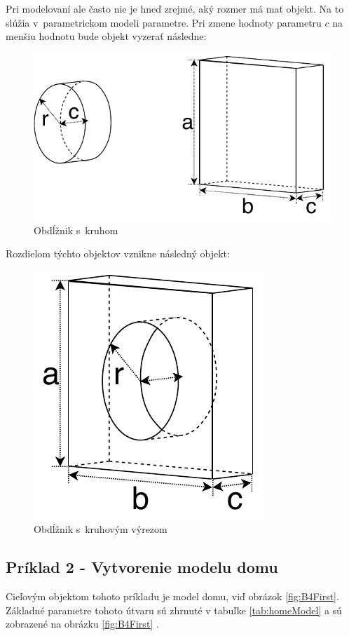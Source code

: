 Pri modelovaní ale často nie je hneď zrejmé, aký rozmer má mať objekt. Na to slúžia v~parametrickom modeli parametre. Pri zmene hodnoty parametru $c$ na menšiu hodnotu bude objekt vyzerať následne:\nopagebreak
\begin{figure}[H]
	\centering
	\includegraphics[height=0.3\textwidth]{obrazky-figures/Examples/A3x.pdf}
	\caption{Obdĺžnik s~kruhom}
	\label{fig:A3x}
\end{figure}
Rozdielom týchto objektov vznikne následný objekt:\nopagebreak
\begin{figure}[H]
	\centering
	\includegraphics[height=0.3\textwidth]{obrazky-figures/Examples/A4x.pdf}
	\caption{Obdĺžnik s~kruhovým výrezom}
	\label{fig:A4x}
\end{figure}

\subsection*{Príklad 2 - Vytvorenie modelu domu}
Cieľovým objektom tohoto príkladu je model domu, viď obrázok \ref{fig:B4First}. Základné parametre tohoto útvaru sú zhrnuté v tabuľke \ref{tab:homeModel}  a sú zobrazené na obrázku \ref{fig:B4First}
\label{sec:homeModel}.
\nopagebreak


